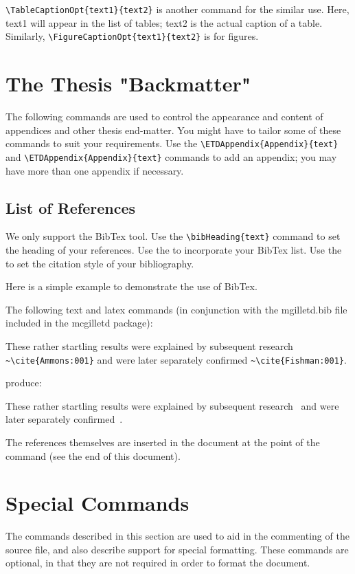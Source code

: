 \documentclass[12pt,Bold,letterpaper,TexShade]{mcgilletdclass}
\begin{document}
\verb=\TableCaptionOpt{text1}{text2}= is another command for the similar use.
Here, text1 will appear in the list of tables; text2 is the actual caption of
a table. Similarly, \verb=\FigureCaptionOpt{text1}{text2}= is for figures. \\



\chapter{The Thesis "Backmatter"}
The following commands are used to control the appearance and content
of appendices and other thesis end-matter.
You might have to tailor some of these commands to suit your 
requirements.
Use the \verb=\ETDAppendix{Appendix}{text}=
and \verb=\ETDAppendix{Appendix}{text}=
commands to add an appendix; you may have more than one appendix if 
necessary.

\section{List of References}
We only support the BibTex tool.
Use the \verb=\bibHeading{text}= command to set the heading of your references.
Use the \verb== to incorporate your BibTex list.
Use the \verb== to set the citation style of your
bibliography.

Here is a simple example to demonstrate the use of BibTex.

The following text and latex commands (in conjunction with the mgilletd.bib
file included in the mcgilletd package):

These rather startling results were explained by subsequent 
research \verb=~\cite{Ammons:001}= and were later separately confirmed \verb=~\cite{Fishman:001}=.

produce:

These rather startling results were explained by subsequent 
research~\cite{Ammons:001} and were later separately confirmed~\cite{Fishman:001}.

The references themselves are inserted in the document at
the point of the \verb== command
(see the end of this document).

\chapter{Special Commands}
The commands described in this section are used to aid in the commenting
of the source file, and also describe support for special formatting.
These commands are optional, in that they are not required in order
to format the document.
\end{document}
